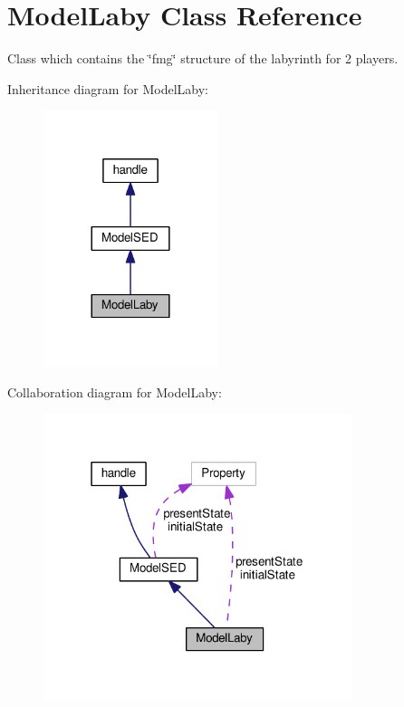 \hypertarget{class_model_laby}{}\section{Model\+Laby Class Reference}
\label{class_model_laby}


Class which contains the \char`\"{}fmg\char`\"{} structure of the labyrinth for 2 players.  




Inheritance diagram for Model\+Laby\+:\nopagebreak
\begin{figure}[H]
\begin{center}
\leavevmode
\includegraphics[width=144pt]{class_model_laby__inherit__graph}
\end{center}
\end{figure}


Collaboration diagram for Model\+Laby\+:\nopagebreak
\begin{figure}[H]
\begin{center}
\leavevmode
\includegraphics[width=256pt]{class_model_laby__coll__graph}
\end{center}
\end{figure}
